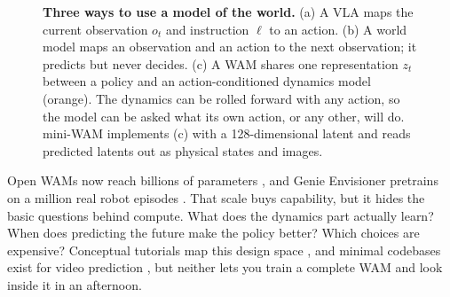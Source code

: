 \documentclass[11pt]{article}
\begin{document}
\begin{figure}[!htbp]
\centering
{}
\caption{\textbf{Three ways to use a model of the world.} (a) A VLA maps the current observation $o_t$ and instruction $\ell$ to an action. (b) A world model maps an observation and an action to the next observation; it predicts but never decides. (c) A WAM shares one representation $z_t$ between a policy and an action-conditioned dynamics model (orange). The dynamics can be rolled forward with any action, so the model can be asked what its own action, or any other, will do. mini-WAM implements (c) with a 128-dimensional latent and reads predicted latents out as physical states and images.}
\label{fig:paradigms}
\end{figure}

Open WAMs now reach billions of parameters \citep{liao2025genie,kim2026cosmospolicy,li2026lingbotva}, and Genie Envisioner pretrains on a million real robot episodes \citep{liao2025genie}. That scale buys capability, but it hides the basic questions behind compute. What does the dynamics part actually learn? When does predicting the future make the policy better? Which choices are expensive? Conceptual tutorials map this design space \citep{zhang2026tutorial}, and minimal codebases exist for video prediction \citep{huang2026nano}, but neither lets you train a complete WAM and look inside it in an afternoon.
\end{document}
